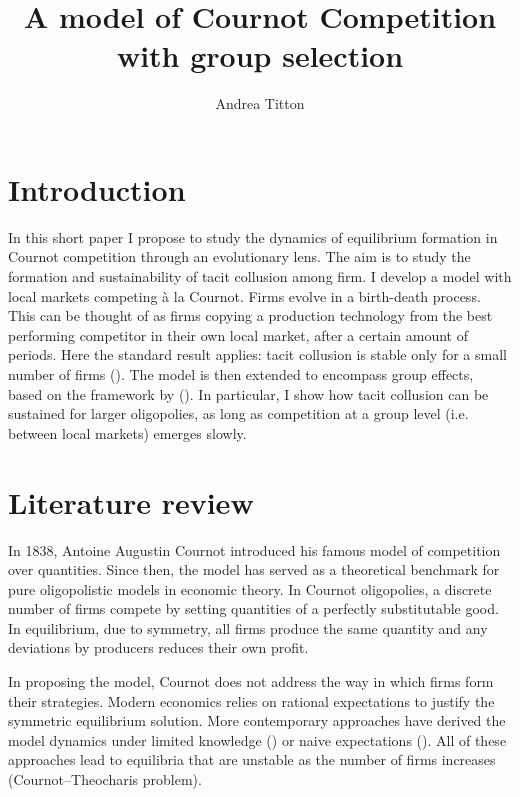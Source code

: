 \documentclass[american]{scrartcl}
\title{A model of Cournot Competition with group selection}
\author{Andrea Titton}
\newcommand{\citein}[1]{\citeauthor{#1} (\citeyear{#1})}
\begin{document}

\maketitle

\section{Introduction}


In this short paper I propose to study the dynamics of equilibrium formation in Cournot competition through an evolutionary lens. The aim is to study the formation and sustainability of tacit collusion among firm. I develop a model with local markets competing à la Cournot. Firms evolve in a birth-death process. This can be thought of as firms copying a production technology from the best performing competitor in their own local market, after a certain amount of periods. Here the standard result applies: tacit collusion is stable only for a small number of firms (\cite{Lampart2012}). The model is then extended to encompass group effects, based on the framework by \citein{Akdeniz2020}. In particular, I show how tacit collusion can be sustained for larger oligopolies, as long as competition at a group level (i.e. between local markets) emerges slowly.

\section{Literature review}

In 1838, Antoine Augustin Cournot introduced his famous model of competition over quantities. Since then, the model has served as a theoretical benchmark for pure oligopolistic models in economic theory. In Cournot oligopolies, a discrete number of firms compete by setting quantities of a perfectly substitutable good. In equilibrium, due to symmetry, all firms produce the same quantity and any deviations by producers reduces their own profit.

In proposing the model, Cournot does not address the way in which firms form their strategies. Modern economics relies on rational expectations to justify the symmetric equilibrium solution. More contemporary approaches have derived the model dynamics under limited knowledge (\cite{Bischi2015}) or naive expectations (\cite{Cnovas2008}). All of these approaches lead to equilibria that are unstable as the number of firms increases (Cournot–Theocharis problem).
\end{document}
